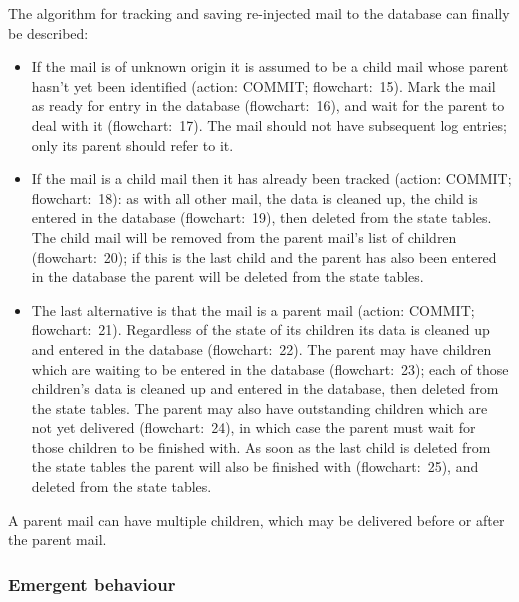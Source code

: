 \documentclass[a4paper,12pt,draft]{article}
\begin{document}
The algorithm for tracking and saving re-injected mail to the database can
finally be described:

\begin{itemize}

    \item If the mail is of unknown origin it is assumed to be a child mail
        whose parent hasn't yet been identified (action: COMMIT\@;
        flowchart:~15).  Mark the mail as ready for entry in the database
        (flowchart:~16), and wait for the parent to deal with it
        (flowchart:~17).  The mail should not have subsequent log entries;
        only its parent should refer to it.

    \item If the mail is a child mail then it has already been tracked
        (action: COMMIT\@; flowchart:~18): as with all other mail, the data
        is cleaned up, the child is entered in the database
        (flowchart:~19), then deleted from the state tables.  The child
        mail will be removed from the parent mail's list of children
        (flowchart:~20); if this is the last child and the parent has also
        been entered in the database the parent will be deleted from the
        state tables.

    \item The last alternative is that the mail is a parent mail (action:
        COMMIT\@; flowchart:~21).  Regardless of the state of its children
        its data is cleaned up and entered in the database (flowchart:~22).
        The parent may have children which are waiting to be entered in the
        database (flowchart:~23); each of those children's data is cleaned
        up and entered in the database, then deleted from the state tables.
        The parent may also have outstanding children which are not yet
        delivered (flowchart:~24), in which case the parent must wait for
        those children to be finished with.  As soon as the last child is
        deleted from the state tables the parent will also be finished with
        (flowchart:~25), and deleted from the state tables.

\end{itemize}

A parent mail can have multiple children, which may be delivered before or
after the parent mail.

\subsubsection{Emergent behaviour}
\end{document}
